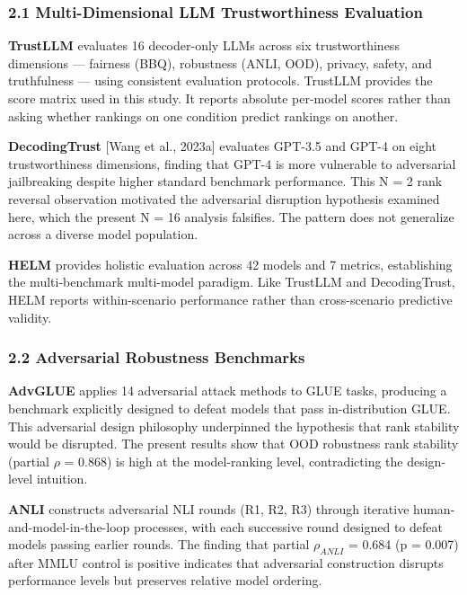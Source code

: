 
\subsubsection{2.1 Multi-Dimensional LLM Trustworthiness Evaluation}

\textbf{TrustLLM} \citep{Sun2024TrustLLM} evaluates 16 decoder-only LLMs across six trustworthiness dimensions --- fairness (BBQ), robustness (ANLI, OOD), privacy, safety, and truthfulness --- using consistent evaluation protocols. TrustLLM provides the score matrix used in this study. It reports absolute per-model scores rather than asking whether rankings on one condition predict rankings on another.

\textbf{DecodingTrust} [Wang et al., 2023a] evaluates GPT-3.5 and GPT-4 on eight trustworthiness dimensions, finding that GPT-4 is more vulnerable to adversarial jailbreaking despite higher standard benchmark performance. This N = 2 rank reversal observation motivated the adversarial disruption hypothesis examined here, which the present N = 16 analysis falsifies. The pattern does not generalize across a diverse model population.

\textbf{HELM} \citep{Liang2022Holistic} provides holistic evaluation across 42 models and 7 metrics, establishing the multi-benchmark multi-model paradigm. Like TrustLLM and DecodingTrust, HELM reports within-scenario performance rather than cross-scenario predictive validity.

\subsubsection{2.2 Adversarial Robustness Benchmarks}

\textbf{AdvGLUE} \citep{Wang2021AdvGLUE} applies 14 adversarial attack methods to GLUE tasks, producing a benchmark explicitly designed to defeat models that pass in-distribution GLUE. This adversarial design philosophy underpinned the hypothesis that rank stability would be disrupted. The present results show that OOD robustness rank stability (partial $\rho$ = 0.868) is high at the model-ranking level, contradicting the design-level intuition.

\textbf{ANLI} \citep{Nie2020Adversarial} constructs adversarial NLI rounds (R1, R2, R3) through iterative human-and-model-in-the-loop processes, with each successive round designed to defeat models passing earlier rounds. The finding that partial $\rho_{ANLI}$ = 0.684 (p = 0.007) after MMLU control is positive indicates that adversarial construction disrupts performance levels but preserves relative model ordering.

